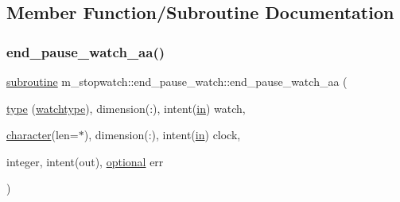 \subsection{Member Function/\+Subroutine Documentation}
\mbox{\label{interfacem__stopwatch_1_1end__pause__watch_a8a8454ef64a4425ab2ff6545938a2060}} 
\subsubsection{\texorpdfstring{end\+\_\+pause\+\_\+watch\+\_\+aa()}{end\_pause\_watch\_aa()}}
{\footnotesize\ttfamily \hyperlink{M__stopwatch_83_8txt_acfbcff50169d691ff02d4a123ed70482}{subroutine} m\+\_\+stopwatch\+::end\+\_\+pause\+\_\+watch\+::end\+\_\+pause\+\_\+watch\+\_\+aa (\begin{DoxyParamCaption}\item[{\hyperlink{stop__watch_83_8txt_a70f0ead91c32e25323c03265aa302c1c}{type} (\hyperlink{structm__stopwatch_1_1watchtype}{watchtype}), dimension(\+:), intent(\hyperlink{M__journal_83_8txt_afce72651d1eed785a2132bee863b2f38}{in})}]{watch,  }\item[{\hyperlink{option__stopwatch_83_8txt_abd4b21fbbd175834027b5224bfe97e66}{character}(len=$\ast$), dimension(\+:), intent(\hyperlink{M__journal_83_8txt_afce72651d1eed785a2132bee863b2f38}{in})}]{clock,  }\item[{integer, intent(out), \hyperlink{option__stopwatch_83_8txt_aa4ece75e7acf58a4843f70fe18c3ade5}{optional}}]{err }\end{DoxyParamCaption})\hspace{0.3cm}{\ttfamily [private]}}

\mbox{\label{interfacem__stopwatch_1_1end__pause__watch_aa403e6b2b62e3f99b212e07a7a8fedb8}} 
